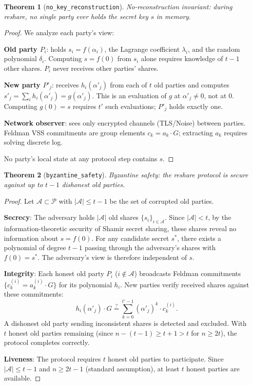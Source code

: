 \documentclass[11pt]{article}
\newtheorem{theorem}{Theorem}
\begin{document}
\begin{theorem}[\texttt{no\_key\_reconstruction}]
No-reconstruction invariant: during reshare, no single party ever holds the secret key $s$ in memory.
\end{theorem}
\begin{proof}
We analyze each party's view:

\textbf{Old party $P_i$}: holds $s_i = f(\alpha_i)$, the Lagrange coefficient $\lambda_i$, and the random polynomial $\delta_i$. Computing $s = f(0)$ from $s_i$ alone requires knowledge of $t-1$ other shares. $P_i$ never receives other parties' shares.

\textbf{New party $P'_j$}: receives $h_i(\alpha'_j)$ from each of $t$ old parties and computes $s'_j = \sum_i h_i(\alpha'_j) = g(\alpha'_j)$. This is an evaluation of $g$ at $\alpha'_j \neq 0$, not at $0$. Computing $g(0) = s$ requires $t'$ such evaluations; $P'_j$ holds exactly one.

\textbf{Network observer}: sees only encrypted channels (TLS/Noise) between parties. Feldman VSS commitments are group elements $c_k = a_k \cdot G$; extracting $a_k$ requires solving discrete log.

No party's local state at any protocol step contains $s$.
\end{proof}

\begin{theorem}[\texttt{byzantine\_safety}]
Byzantine safety: the reshare protocol is secure against up to $t-1$ dishonest old parties.
\end{theorem}
\begin{proof}
Let $\mathcal{A} \subset \mathcal{P}$ with $|\mathcal{A}| \leq t-1$ be the set of corrupted old parties.

\textbf{Secrecy}: The adversary holds $|\mathcal{A}|$ old shares $\{s_i\}_{i \in \mathcal{A}}$. Since $|\mathcal{A}| < t$, by the information-theoretic security of Shamir secret sharing, these shares reveal no information about $s = f(0)$. For any candidate secret $s^*$, there exists a polynomial of degree $t-1$ passing through the adversary's shares with $f(0) = s^*$. The adversary's view is therefore independent of $s$.

\textbf{Integrity}: Each honest old party $P_i$ ($i \notin \mathcal{A}$) broadcasts Feldman commitments $\{c_k^{(i)} = a_k^{(i)} \cdot G\}$ for its polynomial $h_i$. New parties verify received shares against these commitments:
\[
  h_i(\alpha'_j) \cdot G \stackrel{?}{=} \sum_{k=0}^{t'-1} (\alpha'_j)^k \cdot c_k^{(i)}.
\]
A dishonest old party sending inconsistent shares is detected and excluded. With $t$ honest old parties remaining (since $n - (t-1) \geq t+1 > t$ for $n \geq 2t$), the protocol completes correctly.

\textbf{Liveness}: The protocol requires $t$ honest old parties to participate. Since $|\mathcal{A}| \leq t-1$ and $n \geq 2t-1$ (standard assumption), at least $t$ honest parties are available.
\end{proof}
\end{document}
